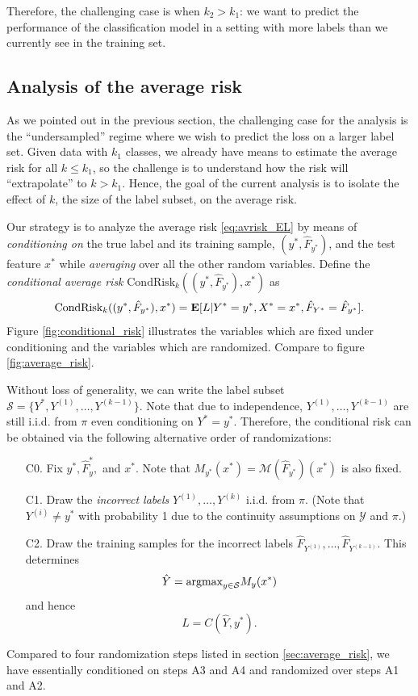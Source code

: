 \documentclass[12pt]{article}
\begin{document}
Therefore, the challenging case is when $k_2 > k_1$: we want to
predict the performance of the classification model in a setting with
more labels than we currently see in the training set.

\subsection{Analysis of the average risk}

As we pointed out in the previous section, the challenging case for
the analysis is the ``undersampled'' regime where we wish to predict
the loss on a larger label set.  Given data with $k_1$ classes, we
already have means to estimate the average risk for all $k \leq k_1$,
so the challenge is to understand how the risk will ``extrapolate'' to
$k > k_1$.  Hence, the goal of the current analysis is to isolate the
effect of $k$, the size of the label subset, on the average risk.

Our strategy is to analyze the average risk \eqref{eq:avrisk_EL} by
means of \emph{conditioning on} the true label and its training
sample, $(y^*, \hat{F}_{y^*})$, and the test feature $x^*$
while \emph{averaging} over all the other random variables.  Define
the \emph{conditional average risk} $\text{CondRisk}_k((y^*, \hat{F}_{y^*}), x^*)$ as
\[
\text{CondRisk}_k((y^*, \hat{F}_{y^*}), x^*) = \textbf{E}[L|Y^*=y^*, X^* = x^*, \hat{F}_{Y^*} = \hat{F}_{y^*}].
\]
Figure \ref{fig:conditional_risk} illustrates the variables which are
fixed under conditioning and the variables which are randomized.
Compare to figure \ref{fig:average_risk}.

Without loss of generality, we can write the label subset $\mathcal{S}
= \{Y^*, Y^{(1)},\hdots, Y^{(k-1)}\}$.  Note that due to independence,
$Y^{(1)},\hdots, Y^{(k-1)}$ are still i.i.d. from $\pi$ even
conditioning on $Y^* = y^*.$ Therefore, the conditional risk can be
obtained via the following alternative order of randomizations:
\begin{enumerate}
\item[C0.] 
Fix $y^*, \hat{F}_y^*,$ and $x^*$.  Note that $M_{y^*}(x^*)
= \mathcal{M}(\hat{F}_{y^*})(x^*)$ is also fixed.
\item[C1.]
Draw the \emph{incorrect labels} $Y^{(1)},\hdots, Y^{(k)}$ i.i.d. from
$\pi$.  (Note that $Y^{(i)} \neq y^*$ with probability 1 due to the
continuity assumptions on $\mathcal{Y}$ and $\pi$.)
\item[C2.]
Draw the training samples for the incorrect labels
$\hat{F}_{Y^{(1)}},\hdots, \hat{F}_{Y^{(k-1)}}$.  This determines
\[
\hat{Y} = \text{argmax}_{y \in \mathcal{S}} M_y(x^*)
\]
and hence
\[
L = C(\hat{Y}, y^*).
\]
\end{enumerate}
Compared to four randomization steps listed in
section \ref{sec:average_risk}, we have essentially conditioned on
steps A3 and A4 and randomized over steps A1 and A2.
\end{document}
